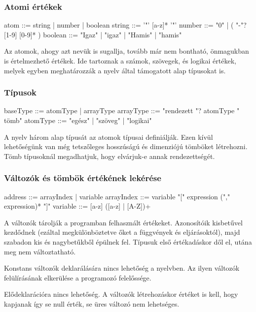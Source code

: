 \subsubsection{Atomi értékek}

\begin{ebnf}
atom ::= string | number | boolean
string ::= '"' [a-z]* '"'
number ::= "0" | ( "-"? [1-9] [0-9]* )
boolean ::= "Igaz" | "igaz" | "Hamis" | "hamis"
\end{ebnf}

Az atomok, ahogy azt nevük is sugallja, tovább már nem bontható, önmagukban is értelmezhető értékek. Ide tartoznak a számok, szövegek, és logikai értékek, melyek egyben meghatározzák a nyelv által támogatott alap típusokat is.

\subsubsection{Típusok}

\begin{ebnf}
baseType ::= atomType | arrayType
arrayType ::= "rendezett "? atomType " tömb"
atomType ::= "egész" | "szöveg" | "logikai"
\end{ebnf}

A nyelv három alap típusát az atomok típusai definiálják. Ezen kívül lehetőségünk van még tetszőleges hosszúságú és dimenziójú tömböket létrehozni. Tömb típusoknál megadhatjuk, hogy elvárjuk-e annak rendezettségét.

\subsubsection{Változók és tömbök értékének lekérése}

\begin{ebnf}
address ::= arrayIndex | variable
arrayIndex ::= variable "[" expression ("," expression)* "]"
variable ::= [a-z] ([a-z] | [A-Z])+
\end{ebnf}

A változók tárolják a programban felhasznált értékeket. Azonosítóik kisbetűvel kezdődnek (ezáltal megkülönböztetve őket a függvények és eljárásoktól), majd szabadon kis és nagybetűkből épülnek fel. Típusuk első értékadáskor dől el, utána meg nem változtatható. 

Konstans változók deklarálására nincs lehetőség a nyelvben. Az ilyen változók felülírásának elkerülése a programozó felelőssége.

Elődeklarációra nincs lehetőség. A változók létrehozáskor értéket is kell, hogy kapjanak így se null érték, se üres változó nem lehetséges.

